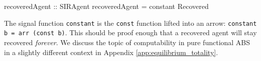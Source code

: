 \begin{HaskellCode}
recoveredAgent :: SIRAgent
recoveredAgent = constant Recovered
\end{HaskellCode}

The signal function \texttt{constant} is the \texttt{const} function lifted into an arrow: \texttt{constant b = arr (const b)}. This should be proof enough that a recovered agent will stay recovered \textit{forever}. We discuss the topic of computability in pure functional ABS in a slightly different context in Appendix \ref{app:equilibrium_totality}.